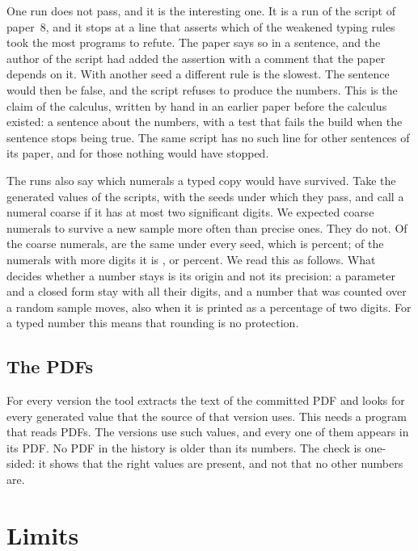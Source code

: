 \documentclass[acmsmall,nonacm,screen]{acmart}
\newcommand{\claim}[2]{#2}
\begin{document}
\claim{one-stops}{One run does not pass}, and it is the interesting one. It is a run of the script of
paper~8, and it stops at a line that asserts which of the weakened typing rules took the
most programs to refute. The paper says so in a sentence, and the author of the script had
added the assertion with a comment that the paper depends on it. With another seed a
different rule is the slowest. The sentence would then be false, and the script refuses to
produce the numbers. This is the claim of the calculus, written by hand in an earlier paper
before the calculus existed: a sentence about the numbers, with a test that fails the build
when the sentence stops being true. The same script has no such line for other sentences of
its paper, and for those nothing would have stopped.

The runs also say which numerals a typed copy would have survived. Take the generated
values of the scripts, with the seeds under which they pass, and call a numeral coarse if it
has at most two significant digits. We expected coarse numerals to survive a new sample more
often than precise ones. \claim{coarse-no-better}{They do not.} Of the \exSeedCoarse{} coarse
numerals, \exSeedCoarseKept{} are the same under every seed, which is \exSeedCoarsePercent{}
percent; of the \exSeedFine{} numerals with more digits it is \exSeedFineKept{}, or
\exSeedFinePercent{} percent. We read this as follows. What decides whether a number stays
is its origin and not its precision: a parameter and a closed form stay with all their
digits, and a number that was counted over a random sample moves, also when it is printed as
a percentage of two digits. For a typed number this means that rounding is no protection.

\subsection{The PDFs}

For every version the tool extracts the text of the committed PDF and looks for every
generated value that the source of that version uses. This needs a program that reads PDFs.
The \exVersions{} versions use \exPdfValues{} such values, and
\claim{pdf-agree}{every one of them appears in its PDF}. No PDF in the history is older than
its numbers. The check is one-sided: it shows that the right values are present, and not that
no other numbers are.

\section{Limits}
\label{sec:limits}
\end{document}
